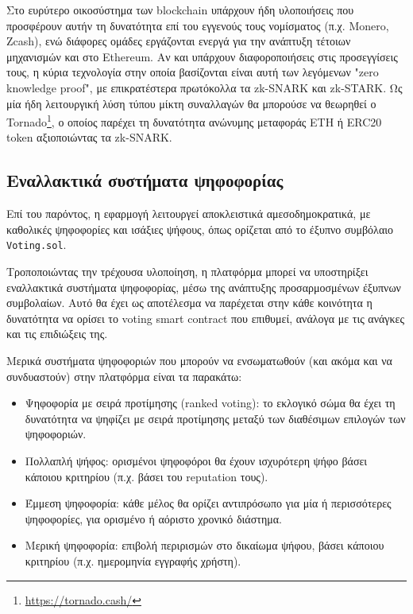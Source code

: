Στο ευρύτερο οικοσύστημα των blockchain υπάρχουν ήδη υλοποιήσεις που προσφέρουν αυτήν τη δυνατότητα επί του εγγενούς τους νομίσματος (π.χ. Monero, Zcash), ενώ διάφορες ομάδες εργάζονται ενεργά για την ανάπτυξη τέτοιων μηχανισμών και στο Ethereum. Αν και υπάρχουν διαφοροποιήσεις στις προσεγγίσεις τους, η κύρια τεχνολογία στην οποία βασίζονται είναι αυτή των λεγόμενων "zero knowledge proof", με επικρατέστερα πρωτόκολλα τα zk-SNARK και zk-STARK. Ως μία ήδη λειτουργική λύση τύπου μίκτη συναλλαγών θα μπορούσε να θεωρηθεί ο Tornado\footnote{\url{https://tornado.cash/}}, ο οποίος παρέχει τη δυνατότητα ανώνυμης μεταφοράς ETH ή ERC20 token αξιοποιώντας τα zk-SNARK.\cite{5.2-privacy-on-ethereum}

\subsection{Εναλλακτικά συστήματα ψηφοφορίας}\label{subsection:5-2-3-alternative-voting-systems}

Επί του παρόντος, η εφαρμογή λειτουργεί αποκλειστικά αμεσοδημοκρατικά, με καθολικές ψηφοφορίες και ισάξιες ψήφους, όπως ορίζεται από το έξυπνο συμβόλαιο \texttt{Voting.sol}.

Τροποποιώντας την τρέχουσα υλοποίηση, η πλατφόρμα μπορεί να υποστηρίξει εναλλακτικά συστήματα ψηφοφορίας, μέσω της ανάπτυξης προσαρμοσμένων έξυπνων συμβολαίων. Αυτό θα έχει ως αποτέλεσμα να παρέχεται στην κάθε κοινότητα η δυνατότητα να ορίσει το voting smart contract που επιθυμεί, ανάλογα με τις ανάγκες και τις επιδιώξεις της.

Μερικά συστήματα ψηφοφοριών που μπορούν να ενσωματωθούν (και ακόμα και να συνδυαστούν) στην πλατφόρμα είναι τα παρακάτω:

\begin{itemize}
	\item Ψηφοφορία με σειρά προτίμησης (ranked voting): το εκλογικό σώμα θα έχει τη δυνατότητα να ψηφίζει με σειρά προτίμησης μεταξύ των διαθέσιμων επιλογών των ψηφοφοριών.
	\item Πολλαπλή ψήφος: ορισμένοι ψηφοφόροι θα έχουν ισχυρότερη ψήφο βάσει κάποιου κριτηρίου (π.χ. βάσει του reputation τους).
	\item Έμμεση ψηφοφορία: κάθε μέλος θα ορίζει αντιπρόσωπο για μία ή περισσότερες ψηφοφορίες, για ορισμένο ή αόριστο χρονικό διάστημα.
	\item Μερική ψηφοφορία: επιβολή περιρισμών στο δικαίωμα ψήφου, βάσει κάποιου κριτηρίου (π.χ. ημερομηνία εγγραφής χρήστη).
\end{itemize}

